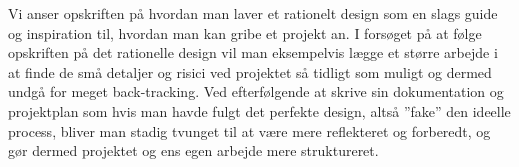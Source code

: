 \documentclass[12pt,a4paper]{article}
\begin{document}
Vi anser opskriften på hvordan man laver et rationelt design som en slags guide og inspiration til, hvordan man kan gribe et projekt an. I forsøget på at følge opskriften på det rationelle design vil man eksempelvis lægge et større arbejde i at finde de små detaljer og risici ved projektet så tidligt som muligt og dermed undgå for meget back-tracking.
Ved efterfølgende at skrive sin dokumentation og projektplan som hvis man havde fulgt det perfekte design, altså ”fake” den ideelle process, bliver man stadig tvunget til at være mere reflekteret og forberedt, og gør dermed projektet og ens egen arbejde mere struktureret. 
\end{document}
